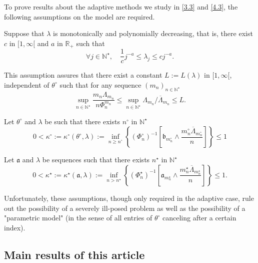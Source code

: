 To prove results about the adaptive methods we study in \textsc{\cref{3.3}} and \textsc{\cref{4.3}}, the following assumptions on the model are required.

\begin{as}\label{as1}
Suppose that $\lambda$ is monotonically and polynomially decreasing, that is, there exist $c$ in $[1, \infty[$ and $a$ in $\mathds{R}_{+}$ such that
\[\forall j \in \mathds{N}^{\star}, \quad \frac{1}{c} j^{-a} \leq \lambda_{j} \leq c j^{-a}.\]
\end{as}

This assumption assures that there exist a constant $L := L(\lambda)$ in $[1, \infty[$, independent of $\theta^{\circ}$ such that for any sequence $\left(m_{n}\right)_{n \in \mathds{N}^{\star}}$ 
\[\sup\limits_{n \in \mathds{N}^{\star}} \frac{m_{n} \Lambda_{m_{n}}}{n \Phi_{n}^{m_{n}}} \leq \sup\limits_{n \in \mathds{N}^{\star}} \Lambda_{m_{n}}/\overline{\Lambda}_{m_{n}} \leq L.\]

\begin{as}\label{as2}
Let $\theta^{\circ}$ and $\lambda$ be such that there exists $n^{\circ}$ in $\mathds{N}^{\star}$
\[0 < \kappa^{\circ} := \kappa^{\circ}(\theta^{\circ}, \lambda) := \inf\limits_{n \geq n^{\circ}} \left\{\left(\Phi_{n}^{\circ}\right)^{-1} \left[\mathfrak{b}_{m_{n}^{\circ}} \wedge \frac{m_{n}^{\circ} \overline{\Lambda}_{m_{n}^{\circ}}}{n}\right]\right\} \leq 1\]
\end{as}

\begin{as}\label{as3}
Let $\mathfrak{a}$ and $\lambda$ be sequences such that there exists $n^{\star}$ in $\mathds{N}^{\star}$
\[0 < \kappa^{\star} := \kappa^{\star}(\mathfrak{a}, \lambda) := \inf\limits_{n > n^{\star}} \left\{\left(\Phi_{n}^{\star}\right)^{-1}\left[\mathfrak{a}_{m_{n}^{\star}} \wedge \frac{m_{n}^{\star} \overline{\Lambda}_{m_{n}^{\star}}}{n}\right]\right\} \leq 1.\]
\end{as}

Unfortunately, these assumptions, though only required in the adaptive case, rule out the possibility of a severely ill-posed problem as well as the possibility of a "parametric model" (in the sense of all entries of $\theta^{\circ}$ canceling after a certain index).

\subsection{Main results of this article}\label{1.4}

